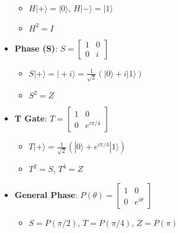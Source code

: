 \begin{multicols}{3}
\begin{itemize}[leftmargin=*,nosep,topsep=0pt]
\begin{itemize}[nosep]
                  \item $H|+\rangle = |0\rangle$, $H|-\rangle = |1\rangle$

                  \item $H^2 = I$
                \end{itemize}

                \item \textbf{Phase (S)}: $S = \begin{bmatrix} 1 & 0 \\ 0 & i \end{bmatrix}$
                  \begin{itemize}[nosep]
                    \item $S|+\rangle = |+i\rangle = \frac{1}{\sqrt{2}}(|0\rangle +
                      i|1\rangle)$

                    \item $S^2 = Z$
                  \end{itemize}

                \item \textbf{T Gate}: $T = \begin{bmatrix} 1 & 0 \\ 0 & e^{i\pi/4}
                  \end{bmatrix}$
                  \begin{itemize}[nosep]
                    \item $T|+\rangle = \frac{1}{\sqrt{2}}(|0\rangle + e^{i\pi/4}|1\rangle)$
                    \item $T^2 = S$, $T^4 = Z$
                  \end{itemize}

                  \item \textbf{General Phase}: $P(\theta) = \begin{bmatrix} 1 & 0 \\ 0 &
                    e^{i\theta} \end{bmatrix}$
                    \begin{itemize}[nosep]
                      \item $S = P(\pi/2)$, $T = P(\pi/4)$, $Z = P(\pi)$
                    \end{itemize}
                  \end{itemize}


\end{multicols}
